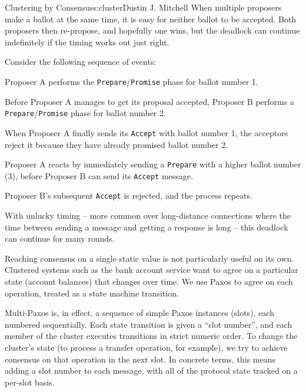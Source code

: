 \begin{aosachapter}{Clustering by Consensus}{s:cluster}{Dustin J. Mitchell}
When multiple proposers make a ballot at the same time, it is easy for
neither ballot to be accepted. Both proposers then re-propose, and
hopefully one wins, but the deadlock can continue indefinitely if the
timing works out just right.

Consider the following sequence of events:

\begin{aosaitemize}

\item
  Proposer A performs the \texttt{Prepare}/\texttt{Promise} phase for
  ballot number 1.
\item
  Before Proposer A manages to get its proposal accepted, Proposer B
  performs a \texttt{Prepare}/\texttt{Promise} phase for ballot number
  2.
\item
  When Proposer A finally sends its \texttt{Accept} with ballot number
  1, the acceptors reject it because they have already promised ballot
  number 2.
\item
  Proposer A reacts by immediately sending a \texttt{Prepare} with a
  higher ballot number (3), before Proposer B can send its
  \texttt{Accept} message.
\item
  Proposer B's subsequent \texttt{Accept} is rejected, and the process
  repeats.
\end{aosaitemize}

With unlucky timing -- more common over long-distance connections where
the time between sending a message and getting a response is long --
this deadlock can continue for many rounds.

\label{multi-paxos}

Reaching consensus on a single static value is not particularly useful
on its own. Clustered systems such as the bank account service want to
agree on a particular state (account balances) that changes over time.
We use Paxos to agree on each operation, treated as a state machine
transition.

Multi-Paxos is, in effect, a sequence of simple Paxos instances (slots),
each numbered sequentially. Each state transition is given a ``slot
number'', and each member of the cluster executes transitions in strict
numeric order. To change the cluster's state (to process a transfer
operation, for example), we try to achieve consensus on that operation
in the next slot. In concrete terms, this means adding a slot number to
each message, with all of the protocol state tracked on a per-slot
basis.


\end{aosachapter}
